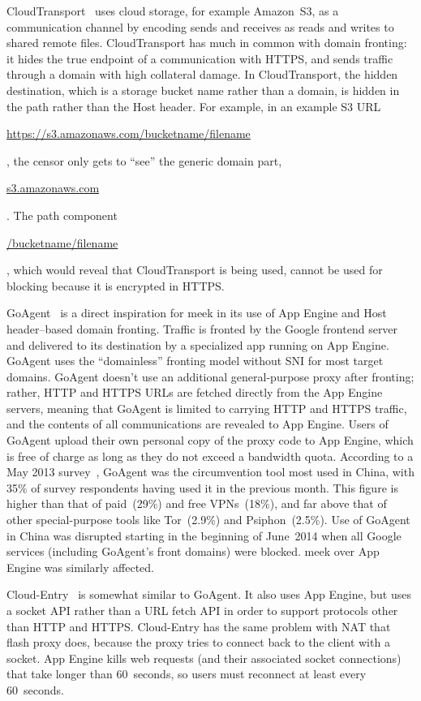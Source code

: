 \documentclass[conference]{IEEEtran}
\def\urll#1{\begin{NoHyper}\url{#1}\end{NoHyper}}
\begin{document}
CloudTransport~\cite{cloudtransport} uses cloud storage, for example Amazon~S3,
as a communication channel by encoding sends and receives as reads and writes to shared remote files.
CloudTransport has much in common with domain fronting:
it hides the true endpoint of a communication with HTTPS,
and sends traffic through a domain with high collateral damage.
In CloudTransport, the hidden destination, which is a storage bucket name rather than a domain,
is hidden in the path rather than the Host header.
For example, in an example S3 URL
\urll{https://s3.amazonaws.com/bucketname/filename},
the censor only gets to ``see'' the generic domain part, \urll{s3.amazonaws.com}.
The path component \urll{/bucketname/filename},
which would reveal that CloudTransport is being used,
cannot be used for blocking because it is encrypted in HTTPS.

GoAgent~\cite{goagent} is a direct inspiration for meek in its use of App
Engine and Host header--based domain fronting.
Traffic is fronted by the Google frontend server
and delivered to its destination by a specialized app running on App Engine.
GoAgent uses the ``domainless'' fronting model without SNI for most target domains.
GoAgent doesn't use an additional general-purpose proxy after fronting;
rather, HTTP and HTTPS URLs are fetched directly from the App Engine servers,
meaning that GoAgent is limited to carrying HTTP and HTTPS traffic,
and the contents of all communications are revealed to App Engine.
Users of GoAgent upload their own personal copy of the proxy code to App Engine,
which is free of charge as long as they do not exceed a bandwidth quota.
According to a May 2013 survey~\cite{collateral-freedom},
GoAgent was the circumvention tool most used in
China, with 35\% of survey respondents having used it in the previous month.
This figure is higher than that of paid~(29\%) and free VPNs~(18\%), and far
above that of other special-purpose tools like Tor~(2.9\%) and Psiphon~(2.5\%).
Use of GoAgent in China was disrupted starting in the beginning of June~2014
when all Google services (including GoAgent's front domains) were blocked.
meek over App Engine was similarly affected.

Cloud-Entry~\cite{cloud-entry} is somewhat similar to GoAgent.
It also uses App Engine, but uses a socket API rather than a URL fetch API
in order to support protocols other than HTTP and HTTPS.
Cloud-Entry has the same problem with NAT that flash proxy does,
because the proxy tries to connect back to the client with a socket.
App Engine kills web requests (and their associated socket connections)
that take longer than 60~seconds,
so users must reconnect at least every 60~seconds.
\end{document}
